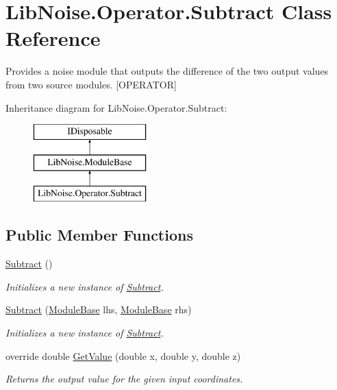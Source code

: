 \hypertarget{class_lib_noise_1_1_operator_1_1_subtract}{}\section{Lib\+Noise.\+Operator.\+Subtract Class Reference}
\label{class_lib_noise_1_1_operator_1_1_subtract}


Provides a noise module that outputs the difference of the two output values from two source modules. \mbox{[}O\+P\+E\+R\+A\+T\+OR\mbox{]}  


Inheritance diagram for Lib\+Noise.\+Operator.\+Subtract\+:\begin{figure}[H]
\begin{center}
\leavevmode
\includegraphics[height=3.000000cm]{class_lib_noise_1_1_operator_1_1_subtract}
\end{center}
\end{figure}
\subsection*{Public Member Functions}
\begin{DoxyCompactItemize}
\item 
\hyperlink{class_lib_noise_1_1_operator_1_1_subtract_a28cd0a57fb54d9d643f084413f404b51}{Subtract} ()
\begin{DoxyCompactList}\small\item\em Initializes a new instance of \hyperlink{class_lib_noise_1_1_operator_1_1_subtract}{Subtract}. \end{DoxyCompactList}\item 
\hyperlink{class_lib_noise_1_1_operator_1_1_subtract_a49e300a6e37f7dfe32b467aa67ab583c}{Subtract} (\hyperlink{class_lib_noise_1_1_module_base}{Module\+Base} lhs, \hyperlink{class_lib_noise_1_1_module_base}{Module\+Base} rhs)
\begin{DoxyCompactList}\small\item\em Initializes a new instance of \hyperlink{class_lib_noise_1_1_operator_1_1_subtract}{Subtract}. \end{DoxyCompactList}\item 
override double \hyperlink{class_lib_noise_1_1_operator_1_1_subtract_af0d3583b9fdbde5da9197c52fbfb6e8c}{Get\+Value} (double x, double y, double z)
\begin{DoxyCompactList}\small\item\em Returns the output value for the given input coordinates. \end{DoxyCompactList}\end{DoxyCompactItemize}
